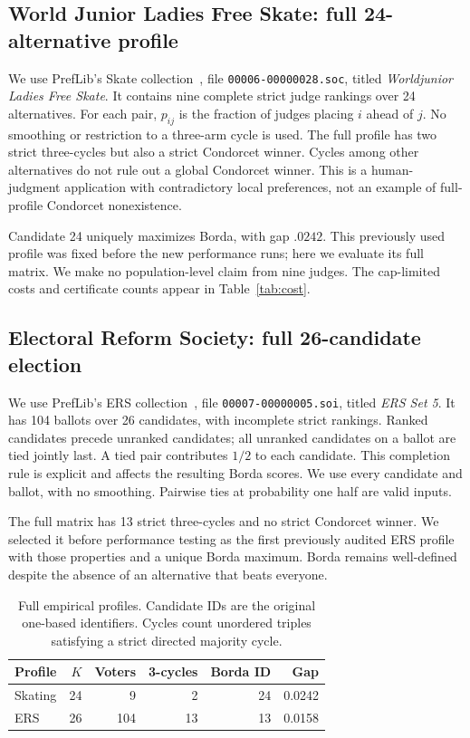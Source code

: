 \documentclass[11pt,a4paper]{article}
\begin{document}
\subsection{World Junior Ladies Free Skate: full 24-alternative profile}
We use PrefLib's Skate collection~\cite{preflib,skate}, file \texttt{00006-00000028.soc}, titled \emph{Worldjunior Ladies Free Skate}. It contains nine complete strict judge rankings over 24 alternatives. For each pair, $p_{ij}$ is the fraction of judges placing $i$ ahead of $j$. No smoothing or restriction to a three-arm cycle is used. The full profile has two strict three-cycles but also a strict Condorcet winner. Cycles among other alternatives do not rule out a global Condorcet winner. This is a human-judgment application with contradictory local preferences, not an example of full-profile Condorcet nonexistence.

Candidate 24 uniquely maximizes Borda, with gap $.0242$. This previously used profile was fixed before the new performance runs; here we evaluate its full matrix. We make no population-level claim from nine judges. The cap-limited costs and certificate counts appear in Table~\ref{tab:cost}.

\subsection{Electoral Reform Society: full 26-candidate election}
We use PrefLib's ERS collection~\cite{preflib,ers}, file \texttt{00007-00000005.soi}, titled \emph{ERS Set 5}. It has 104 ballots over 26 candidates, with incomplete strict rankings. Ranked candidates precede unranked candidates; all unranked candidates on a ballot are tied jointly last. A tied pair contributes $1/2$ to each candidate. This completion rule is explicit and affects the resulting Borda scores. We use every candidate and ballot, with no smoothing. Pairwise ties at probability one half are valid inputs.

The full matrix has 13 strict three-cycles and no strict Condorcet winner. We selected it before performance testing as the first previously audited ERS profile with those properties and a unique Borda maximum. Borda remains well-defined despite the absence of an alternative that beats everyone.

\begin{table}[!htbp]\centering\small\begin{tabular}{lrrrrr}\toprule
Profile&$K$&Voters&3-cycles&Borda ID&Gap\\\midrule
Skating & 24 & 9 & 2 & 24 & 0.0242 \\
ERS & 26 & 104 & 13 & 13 & 0.0158 \\
\bottomrule\end{tabular}\caption{Full empirical profiles. Candidate IDs are the original one-based identifiers. Cycles count unordered triples satisfying a strict directed majority cycle.}\label{tab:real}\end{table}
\end{document}
